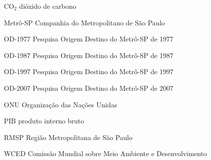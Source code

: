 \documentclass[
  12pt,        %
  openright,      %
  twoside,      %
  a4paper,      %
  english,      %
  brazil        %
]{abntex2}
\begin{document}
%
%

%

%

\listoffigures*
\cleardoublepage

\listofquadros*
\cleardoublepage

\listofgraficos*
\cleardoublepage

\listoftables*
\cleardoublepage


\begin{siglas}
  \item[CO$_2$] dióxido de carbono
  \item[Metrô-SP] Companhia do Metropolitano de São Paulo
  \item[OD-1977] Pesquisa Origem Destino do Metrô-SP de 1977
  \item[OD-1987] Pesquisa Origem Destino do Metrô-SP de 1987
  \item[OD-1997] Pesquisa Origem Destino do Metrô-SP de 1997
  \item[OD-2007] Pesquisa Origem Destino do Metrô-SP de 2007
  \item[ONU] Organização das Nações Unidas
  \item[PIB] produto interno bruto
  \item[RMSP] Região Metropolitana de São Paulo
  \item[WCED] Comissão Mundial sobre Meio Ambiente e Desenvolvimento
\end{siglas}
\end{document}
